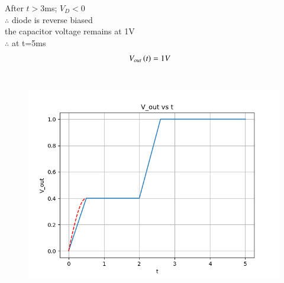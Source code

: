 \documentclass[journal,12pt,twocolumn]{IEEEtran}
\theoremstyle{remark}
\begin{document}
After $t>3$ms; $V_D<0$
\\$\therefore$ diode is reverse biased
\\the capacitor voltage remains at 1V  
\\$\therefore$ at t=5ms
\begin{align}
V_{out}\left(t\right)&=1V
\end{align}
\\\begin{figure}[h]
\renewcommand\thefigure{1}
    \centering
    \includegraphics[width=1\linewidth]{2022/IN/36/figs/typo.png}
    \caption{ }
\end{figure}
\end{document}
